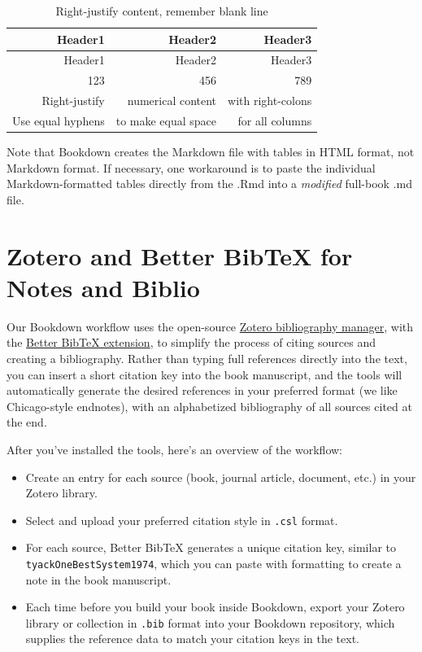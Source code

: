 \documentclass[
  english,
]{book}
\providecommand{\tightlist}{%
  \setlength{\itemsep}{0pt}\setlength{\parskip}{0pt}}
\begin{document}
\begin{longtable}[]{@{}rrr@{}}
\caption{\label{tab:right-table} Right-justify content, remember blank line}\tabularnewline
\toprule
Header1 & Header2 & Header3 \\
\midrule
\endfirsthead
\toprule
Header1 & Header2 & Header3 \\
\midrule
\endhead
123 & 456 & 789 \\
Right-justify & numerical content & with right-colons \\
Use equal hyphens & to make equal space & for all columns \\
\bottomrule
\end{longtable}

Note that Bookdown creates the Markdown file with tables in HTML format, not Markdown format. If necessary, one workaround is to paste the individual Markdown-formatted tables directly from the .Rmd into a \emph{modified} full-book .md file.

\hypertarget{zotero}{%
\section*{Zotero and Better BibTeX for Notes and Biblio}\label{zotero}}

Our Bookdown workflow uses the open-source \href{https://zotero.org}{Zotero bibliography manager}, with the \href{https://retorque.re/zotero-better-bibtex/}{Better BibTeX extension}, to simplify the process of citing sources and creating a bibliography. Rather than typing full references directly into the text, you can insert a short citation key into the book manuscript, and the tools will automatically generate the desired references in your preferred format (we like Chicago-style endnotes), with an alphabetized bibliography of all sources cited at the end.

After you've installed the tools, here's an overview of the workflow:

\begin{itemize}
\tightlist
\item
  Create an entry for each source (book, journal article, document, etc.) in your Zotero library.
\item
  Select and upload your preferred citation style in \texttt{.csl} format.
\item
  For each source, Better BibTeX generates a unique citation key, similar to \texttt{tyackOneBestSystem1974}, which you can paste with formatting to create a note in the book manuscript.
\item
  Each time before you build your book inside Bookdown, export your Zotero library or collection in \texttt{.bib} format into your Bookdown repository, which supplies the reference data to match your citation keys in the text.
\end{itemize}
\end{document}
